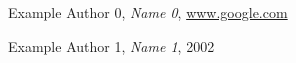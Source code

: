 \begin{thebibliography}{99999}
\singlespace\normalsize

 Example Author 0, \textit{Name 0}, \url{www.google.com}


 Example Author 1, \textit{Name 1}, 2002

\end{thebibliography}
